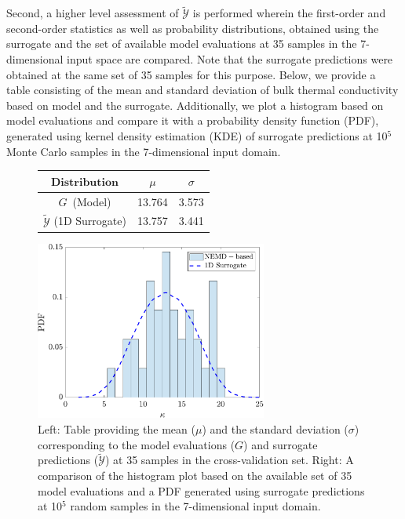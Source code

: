 Second, a higher level assessment of $\tilde{\mathcal{Y}}$ is performed wherein
the first-order and second-order 
statistics as well as probability distributions, obtained using the
surrogate and the set of available model evaluations at 35 samples in the 7-dimensional
input space are compared. Note that the surrogate predictions were obtained at the
same set of 35 samples for this purpose. Below, we provide a table consisting of the
mean and standard deviation of bulk thermal conductivity based on model and the
surrogate. Additionally, we plot a histogram based on model evaluations and compare
it with a probability density function (PDF), generated using kernel density estimation (KDE)
of surrogate predictions at 10$^5$ Monte Carlo samples in the 7-dimensional input domain. 
%
\begin{figure}[htbp]
\begin{center}
\begin{minipage}[htbp]{.25\linewidth}
\vspace{0pt}
\hspace{-25mm}
\begin{tabular}{ccc}
\toprule
$\textbf{Distribution}$ & $\mu$ & $\sigma$ \\ 
\bottomrule
$G$~(Model) & 13.764 & 3.573 \\
$\tilde{\mathcal{Y}}$ (1D Surrogate) & 13.757 & 3.441 \\
\bottomrule
\end{tabular}
\end{minipage}
\hspace{5mm}
\begin{minipage}[htbp]{.25\linewidth}
\vspace{0pt}
\includegraphics[width=3.0in]{./Figures/free_pdf_comp_SSP1D}
\end{minipage}%
\end{center} 
\caption{Left: Table providing the mean ($\mu$) and the standard deviation ($\sigma$) corresponding to
the model evaluations ($G$) and surrogate predictions ($\tilde{\mathcal{Y}}$)
at 35 samples in the cross-validation set. Right: A comparison of the histogram plot based on the
available set of 35 model evaluations and a PDF generated using surrogate predictions at 10$^5$
random samples in the 7-dimensional input domain.}  
\label{fig:level2}
\end{figure}
